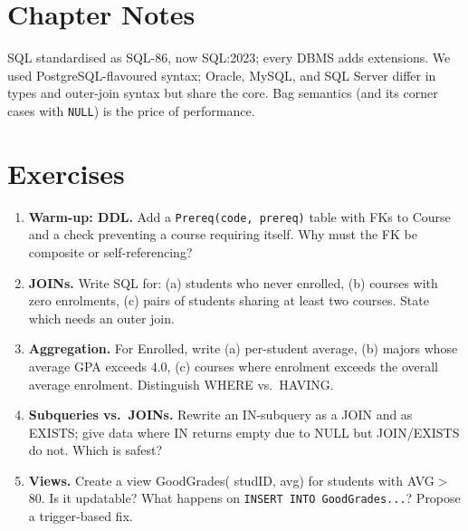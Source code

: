 \section{Chapter Notes}

SQL standardised as SQL-86, now SQL:2023; every DBMS adds extensions. We used PostgreSQL-flavoured syntax; Oracle, MySQL, and SQL Server differ in types and outer-join syntax but share the core. Bag semantics (and its corner cases with \texttt{NULL}) is the price of performance.

\section{Exercises}
\label{sec:ch03-ex}
\begin{enumerate}[label=E3.\arabic*, leftmargin=*, itemsep=0.75em]
    \item \textbf{Warm-up: DDL.} Add a \texttt{Prereq(code, prereq)} table with FKs to Course and a check preventing a course requiring itself. Why must the FK be composite or self-referencing?
    \item \textbf{JOINs.} Write SQL for: (a) students who never enrolled, (b) courses with zero enrolments, (c) pairs of students sharing at least two courses. State which needs an outer join.
    \item \textbf{Aggregation.} For Enrolled, write (a) per-student average, (b) majors whose average GPA exceeds 4.0, (c) courses where enrolment exceeds the overall average enrolment. Distinguish WHERE vs.\ HAVING.
    \item \textbf{Subqueries vs.\ JOINs.} Rewrite an IN-subquery as a JOIN and as EXISTS; give data where IN returns empty due to NULL but JOIN/EXISTS do not. Which is safest?
    \item \textbf{Views.} Create a view GoodGrades( studID, avg) for students with AVG$>$80. Is it updatable? What happens on \texttt{INSERT INTO GoodGrades...}? Propose a trigger-based fix.
\end{enumerate}
